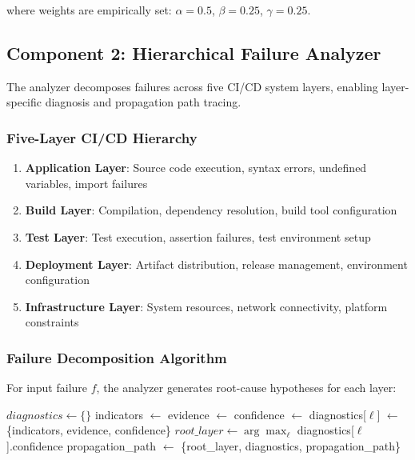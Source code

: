 \documentclass[11pt]{article}
\begin{document}
where weights are empirically set: $\alpha=0.5$, $\beta=0.25$, $\gamma=0.25$.

\subsection{Component 2: Hierarchical Failure Analyzer}

The analyzer decomposes failures across five CI/CD system layers, enabling layer-specific diagnosis and propagation path tracing.

\subsubsection{Five-Layer CI/CD Hierarchy}

\begin{enumerate}
    \item \textbf{Application Layer}: Source code execution, syntax errors, undefined variables, import failures
    \item \textbf{Build Layer}: Compilation, dependency resolution, build tool configuration
    \item \textbf{Test Layer}: Test execution, assertion failures, test environment setup
    \item \textbf{Deployment Layer}: Artifact distribution, release management, environment configuration
    \item \textbf{Infrastructure Layer}: System resources, network connectivity, platform constraints
\end{enumerate}

\subsubsection{Failure Decomposition Algorithm}

For input failure $f$, the analyzer generates root-cause hypotheses for each layer:

\begin{algorithm}
\caption{Hierarchical Failure Analysis}
\begin{algorithmic}[1]
    \State $diagnostics \leftarrow \{\}$
        \State indicators $\leftarrow$ 
        \State evidence $\leftarrow$ 
        \State confidence $\leftarrow$ 
        \State diagnostics[$\ell$] $\leftarrow$ \{indicators, evidence, confidence\}
    \EndFor
    \State $root\_layer \leftarrow \arg\max_\ell$ diagnostics[$\ell$].confidence
    \State propagation\_path $\leftarrow$ 
    \State \Return \{root\_layer, diagnostics, propagation\_path\}
\EndProcedure
\end{algorithmic}
\end{algorithm}
\end{document}
